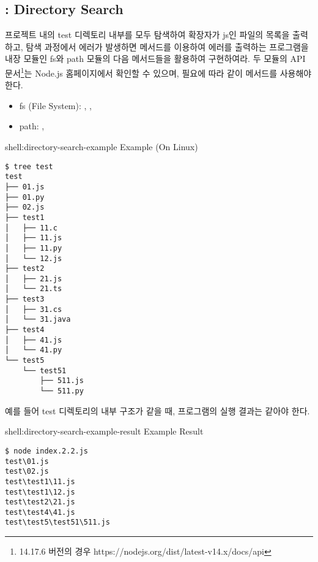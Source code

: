 \subsection*{: Directory Search}

프로젝트 내의 test 디렉토리 내부를 모두 탐색하여 확장자가 js인 파일의 목록을 출력하고, 탐색 과정에서 에러가 발생하면  메서드를 이용하여 에러를 출력하는 프로그램을 내장 모듈인 fs와 path 모듈의 다음 메서드들을 활용하여 구현하여라. 두 모듈의 API 문서\footnote{14.17.6 버전의 경우 https://nodejs.org/dist/latest-v14.x/docs/api}는 Node.js 홈페이지에서 확인할 수 있으며, 필요에 따라 \과 같이  메서드를 사용해야 한다.

\begin{itemize}
    \item fs (File System): , , 
    \item path: , 
\end{itemize}

\begin{shellenv}{shell:directory-search-example}{ Example (On Linux)}\begin{verbatim}
$ tree test
test
├── 01.js
├── 01.py
├── 02.js
├── test1
│   ├── 11.c
│   ├── 11.js
│   ├── 11.py
│   └── 12.js
├── test2
│   ├── 21.js
│   └── 21.ts
├── test3
│   ├── 31.cs
│   └── 31.java
├── test4
│   ├── 41.js
│   └── 41.py
└── test5
    └── test51
        ├── 511.js
        └── 511.py
\end{verbatim}
\end{shellenv}

예를 들어 test 디렉토리의 내부 구조가 \과 같을 때, 프로그램의 실행 결과는 \와 같아야 한다.

\begin{shellenv}{shell:directory-search-example-result}{ Example Result}\begin{verbatim}
$ node index.2.2.js
test\01.js
test\02.js
test\test1\11.js
test\test1\12.js
test\test2\21.js
test\test4\41.js
test\test5\test51\511.js
\end{verbatim}
\end{shellenv}
